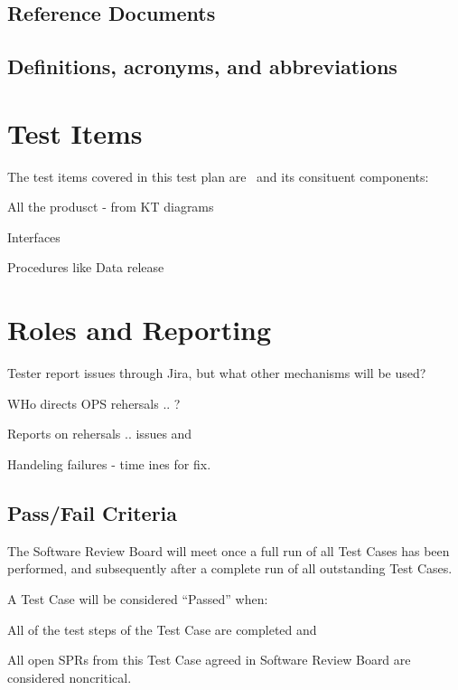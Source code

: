 \subsection{Reference Documents}

\renewcommand{\refname}{}



\subsection{Definitions, acronyms, and abbreviations \label{sect:acronyms}} 


\section{Test Items}

The test items covered in this test plan are \product \ and its consituent components:

\begin{itemize_single}
\item All the produsct - from KT diagrams

\item Interfaces  
\item Procedures like Data release 
\end{itemize_single}


\section{Roles and Reporting}

Tester report issues through Jira, but what other mechanisms will be used?

WHo directs OPS rehersals .. ?

Reports on rehersals .. issues and 


Handeling failures - time ines for fix. 


\subsection{Pass/Fail Criteria}

The Software Review Board will meet once a full run of all Test Cases has been performed, and subsequently after a complete run of all outstanding Test Cases.

A Test Case will be considered ``Passed'' when:
\begin{itemize_single}
\item All of the test steps of the Test Case are completed and
\item All open SPRs from this Test Case agreed in Software Review Board are considered noncritical.
\end{itemize_single}

